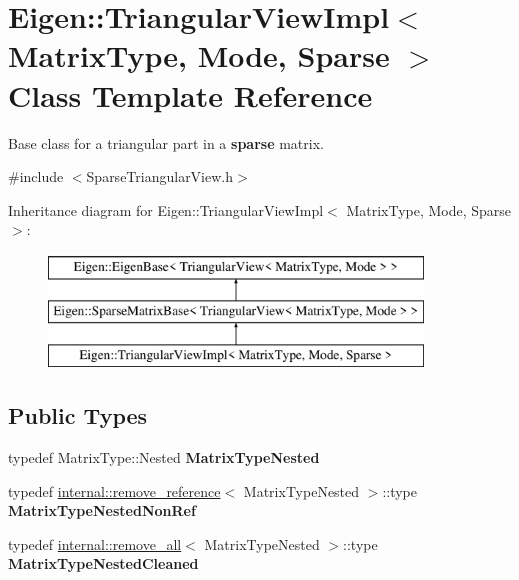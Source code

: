 \hypertarget{class_eigen_1_1_triangular_view_impl_3_01_matrix_type_00_01_mode_00_01_sparse_01_4}{}\section{Eigen\+::Triangular\+View\+Impl$<$ Matrix\+Type, Mode, Sparse $>$ Class Template Reference}
\label{class_eigen_1_1_triangular_view_impl_3_01_matrix_type_00_01_mode_00_01_sparse_01_4}


Base class for a triangular part in a {\bfseries{sparse}} matrix.  




{\ttfamily \#include $<$Sparse\+Triangular\+View.\+h$>$}

Inheritance diagram for Eigen\+::Triangular\+View\+Impl$<$ Matrix\+Type, Mode, Sparse $>$\+:\begin{figure}[H]
\begin{center}
\leavevmode
\includegraphics[height=3.000000cm]{class_eigen_1_1_triangular_view_impl_3_01_matrix_type_00_01_mode_00_01_sparse_01_4}
\end{center}
\end{figure}
\subsection*{Public Types}
\begin{DoxyCompactItemize}
\item 
\mbox{\label{class_eigen_1_1_triangular_view_impl_3_01_matrix_type_00_01_mode_00_01_sparse_01_4_a262b4f203eaea2a8fefad54c7249cff1}} 
typedef Matrix\+Type\+::\+Nested {\bfseries Matrix\+Type\+Nested}
\item 
\mbox{\label{class_eigen_1_1_triangular_view_impl_3_01_matrix_type_00_01_mode_00_01_sparse_01_4_a7a3130ba4b539de4c76561ca79607f93}} 
typedef \mbox{\hyperlink{struct_eigen_1_1internal_1_1remove__reference}{internal\+::remove\+\_\+reference}}$<$ Matrix\+Type\+Nested $>$\+::type {\bfseries Matrix\+Type\+Nested\+Non\+Ref}
\item 
\mbox{\label{class_eigen_1_1_triangular_view_impl_3_01_matrix_type_00_01_mode_00_01_sparse_01_4_a4ae2e6282dc49f205fa3c70fb4053c81}} 
typedef \mbox{\hyperlink{struct_eigen_1_1internal_1_1remove__all}{internal\+::remove\+\_\+all}}$<$ Matrix\+Type\+Nested $>$\+::type {\bfseries Matrix\+Type\+Nested\+Cleaned}
\end{DoxyCompactItemize}
